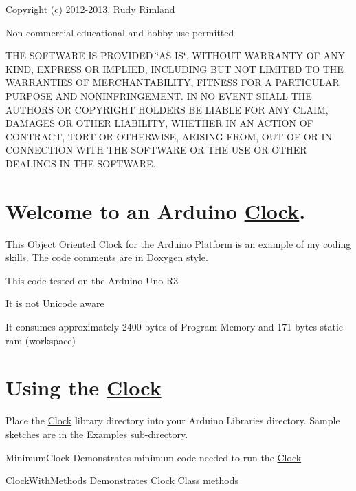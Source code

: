 Copyright (c) 2012-\/2013, Rudy Rimland

Non-\/commercial educational and hobby use permitted

T\-H\-E S\-O\-F\-T\-W\-A\-R\-E I\-S P\-R\-O\-V\-I\-D\-E\-D \char`\"{}\-A\-S I\-S\char`\"{}, W\-I\-T\-H\-O\-U\-T W\-A\-R\-R\-A\-N\-T\-Y O\-F A\-N\-Y K\-I\-N\-D, E\-X\-P\-R\-E\-S\-S O\-R I\-M\-P\-L\-I\-E\-D, I\-N\-C\-L\-U\-D\-I\-N\-G B\-U\-T N\-O\-T L\-I\-M\-I\-T\-E\-D T\-O T\-H\-E W\-A\-R\-R\-A\-N\-T\-I\-E\-S O\-F M\-E\-R\-C\-H\-A\-N\-T\-A\-B\-I\-L\-I\-T\-Y, F\-I\-T\-N\-E\-S\-S F\-O\-R A P\-A\-R\-T\-I\-C\-U\-L\-A\-R P\-U\-R\-P\-O\-S\-E A\-N\-D N\-O\-N\-I\-N\-F\-R\-I\-N\-G\-E\-M\-E\-N\-T. I\-N N\-O E\-V\-E\-N\-T S\-H\-A\-L\-L T\-H\-E A\-U\-T\-H\-O\-R\-S O\-R C\-O\-P\-Y\-R\-I\-G\-H\-T H\-O\-L\-D\-E\-R\-S B\-E L\-I\-A\-B\-L\-E F\-O\-R A\-N\-Y C\-L\-A\-I\-M, D\-A\-M\-A\-G\-E\-S O\-R O\-T\-H\-E\-R L\-I\-A\-B\-I\-L\-I\-T\-Y, W\-H\-E\-T\-H\-E\-R I\-N A\-N A\-C\-T\-I\-O\-N O\-F C\-O\-N\-T\-R\-A\-C\-T, T\-O\-R\-T O\-R O\-T\-H\-E\-R\-W\-I\-S\-E, A\-R\-I\-S\-I\-N\-G F\-R\-O\-M, O\-U\-T O\-F O\-R I\-N C\-O\-N\-N\-E\-C\-T\-I\-O\-N W\-I\-T\-H T\-H\-E S\-O\-F\-T\-W\-A\-R\-E O\-R T\-H\-E U\-S\-E O\-R O\-T\-H\-E\-R D\-E\-A\-L\-I\-N\-G\-S I\-N T\-H\-E S\-O\-F\-T\-W\-A\-R\-E.

\section*{Welcome to an Arduino \hyperlink{class_clock}{Clock}.}

This Object Oriented \hyperlink{class_clock}{Clock} for the Arduino Platform is an example of my coding skills. The code comments are in Doxygen style.


\begin{DoxyItemize}
\item This code tested on the Arduino Uno R3
\item It is not Unicode aware
\item It consumes approximately 2400 bytes of Program Memory and 171 bytes static ram (workspace)
\end{DoxyItemize}

\section*{Using the \hyperlink{class_clock}{Clock}}

Place the \hyperlink{class_clock}{Clock} library directory into your Arduino Libraries directory. Sample sketches are in the Examples sub-\/directory.
\begin{DoxyItemize}
\item Minimum\-Clock Demonstrates minimum code needed to run the \hyperlink{class_clock}{Clock}
\item Clock\-With\-Methods Demonstrates \hyperlink{class_clock}{Clock} Class methods
\end{DoxyItemize}

